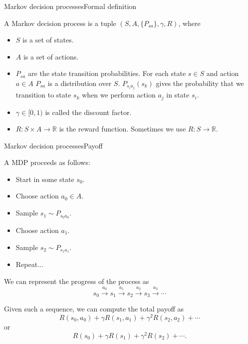 \documentclass{beamer}
\def\Rset{\mathbb{R}}
\begin{document}
\begin{frame}{Markov decision processes}{Formal definition}

  A Markov decision process is a tuple $(S, A, \{P_{sa}\}, \gamma, R)$,
  where
  \begin{itemize}
  \item $S$ is a set of \alert{states}.
  \item $A$ is a set of \alert{actions}.
  \item $P_{sa}$ are the \alert{state transition probabilities}. For
    each state $s \in S$ and action $a \in A$ $P_{sa}$ is a
    distribution over $S$. $P_{s_ia_j}(s_k)$ gives the probability
    that we transition to state $s_k$ when we perform action $a_j$ in
    state $s_i$.
  \item $\gamma \in [0,1)$ is called the \alert{discount factor}.
  \item $R : S \times A \rightarrow \Rset$ is the \alert{reward function}.
    Sometimes we use $R : S \rightarrow \Rset$.
  \end{itemize}

\end{frame}


\begin{frame}{Markov decision processes}{Payoff}

  A MDP proceeds as follows:
  \begin{itemize}
  \item Start in some state $s_0$.
  \item Choose action $a_0 \in A$.
  \item Sample $s_1 \sim P_{s_0a_0}$.
  \item Choose action $a_1$.
  \item Sample $s_2 \sim P_{s_1a_1}$.
  \item Repeat...
  \end{itemize}

  \medskip

  We can represent the progress of the process as
  \[ s_0 \stackrel{a_0}{\rightarrow} s_1 \stackrel{a_1}{\rightarrow}
     s_2 \stackrel{a_2}{\rightarrow} s_3 \stackrel{a_3}{\rightarrow} \cdots
  \]

  Given such a sequence, we can compute the \alert{total payoff} as
  \[ R(s_0,a_0) + \gamma R(s_1,a_1) + \gamma^2 R(s_2,a_2) + \cdots \]
  or
  \[ R(s_0) + \gamma R(s_1) + \gamma^2 R(s_2) + \cdots .\]
  
\end{frame}
\end{document}
